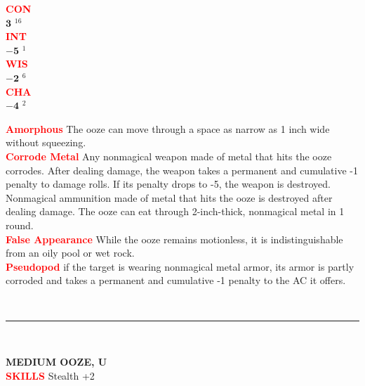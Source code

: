 \documentclass{article}
\begin{document}
\begin{adjustbox}{minipage=0.45\textwidth, margin=\fboxsep, bgimage=../images/texture2.pdf}
{\begin{minipage}[t][10.5in][t]{0.9\textwidth}
\begin{minipage}[t]{0.2\textwidth}
{            \textcolor{red}{\textbf{CON}}\\[0.1em]
            $\mathbf{3}$\,\,$^{16}$ \\[0.1em]
            \textcolor{red}{\textbf{INT}}\\[0.1em]
            $\mathbf{-5}$\,\,$^{1}$ \\[0.1em]
            \textcolor{red}{\textbf{WIS}}\\[0.1em]
            $\mathbf{-2}$\,\,$^{6}$ \\[0.1em]
            \textcolor{red}{\textbf{CHA}}\\[0.1em]
            $\mathbf{-4}$\,\,$^{2}$ \\[0.1em]
            }
        \end{minipage}
        \hspace{-0.1in}
        \vline
        \hspace{0.1in}
        \begin{minipage}[t]{0.7\textwidth}
            \textcolor{red}{\textbf{Amorphous}} The ooze can move through a space as narrow as 1 inch wide without squeezing. \\[0.2em]
            \textcolor{red}{\textbf{Corrode Metal}} Any nonmagical weapon made of metal that hits the ooze corrodes. After dealing damage, the weapon takes a permanent and cumulative -1 penalty to damage rolls. If its penalty drops to -5, the weapon is destroyed. Nonmagical ammunition made of metal that hits the ooze is destroyed after dealing damage.
The ooze can eat through 2-inch-thick, nonmagical metal in 1 round. \\[0.2em]
						\textcolor{red}{\textbf{False Appearance}} While the ooze remains motionless, it is indistinguishable from an oily pool or wet rock. \\[0.2em]
						\textcolor{red}{\textbf{Pseudopod}} if the target is wearing nonmagical metal armor, its armor is partly corroded and takes a permanent and cumulative -1 penalty to the AC it offers. 
        \end{minipage}
        \vspace{0.025in}\\
        \rule{\textwidth}{1pt}\\
        \vspace{-0.08in}
        \begin{flushleft}
            {\large\textbf{MEDIUM OOZE, U}}\\
            \textcolor{red}{\textbf{SKILLS}} Stealth +2 \\

\end{flushleft}
\end{minipage}}
\end{adjustbox}
\end{document}
